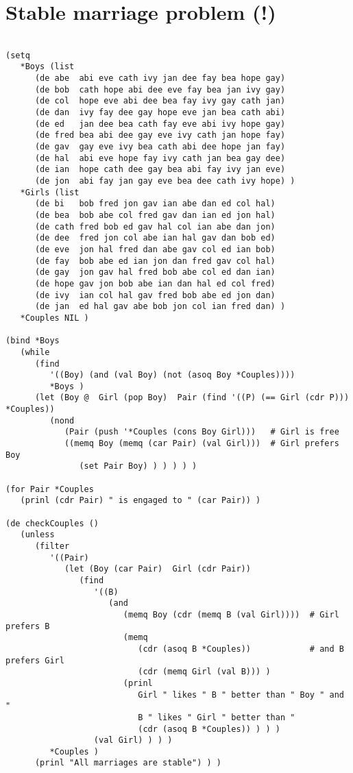 \section*{Stable marriage problem (!)}

\begin{verbatim}

(setq
   *Boys (list
      (de abe  abi eve cath ivy jan dee fay bea hope gay)
      (de bob  cath hope abi dee eve fay bea jan ivy gay)
      (de col  hope eve abi dee bea fay ivy gay cath jan)
      (de dan  ivy fay dee gay hope eve jan bea cath abi)
      (de ed   jan dee bea cath fay eve abi ivy hope gay)
      (de fred bea abi dee gay eve ivy cath jan hope fay)
      (de gav  gay eve ivy bea cath abi dee hope jan fay)
      (de hal  abi eve hope fay ivy cath jan bea gay dee)
      (de ian  hope cath dee gay bea abi fay ivy jan eve)
      (de jon  abi fay jan gay eve bea dee cath ivy hope) )
   *Girls (list
      (de bi   bob fred jon gav ian abe dan ed col hal)
      (de bea  bob abe col fred gav dan ian ed jon hal)
      (de cath fred bob ed gav hal col ian abe dan jon)
      (de dee  fred jon col abe ian hal gav dan bob ed)
      (de eve  jon hal fred dan abe gav col ed ian bob)
      (de fay  bob abe ed ian jon dan fred gav col hal)
      (de gay  jon gav hal fred bob abe col ed dan ian)
      (de hope gav jon bob abe ian dan hal ed col fred)
      (de ivy  ian col hal gav fred bob abe ed jon dan)
      (de jan  ed hal gav abe bob jon col ian fred dan) )
   *Couples NIL )

(bind *Boys
   (while
      (find
         '((Boy) (and (val Boy) (not (asoq Boy *Couples))))
         *Boys )
      (let (Boy @  Girl (pop Boy)  Pair (find '((P) (== Girl (cdr P))) *Couples))
         (nond
            (Pair (push '*Couples (cons Boy Girl)))   # Girl is free
            ((memq Boy (memq (car Pair) (val Girl)))  # Girl prefers Boy
               (set Pair Boy) ) ) ) ) )

(for Pair *Couples
   (prinl (cdr Pair) " is engaged to " (car Pair)) )

(de checkCouples ()
   (unless
      (filter
         '((Pair)
            (let (Boy (car Pair)  Girl (cdr Pair))
               (find
                  '((B)
                     (and
                        (memq Boy (cdr (memq B (val Girl))))  # Girl prefers B
                        (memq
                           (cdr (asoq B *Couples))            # and B prefers Girl
                           (cdr (memq Girl (val B))) )
                        (prinl
                           Girl " likes " B " better than " Boy " and "
                           B " likes " Girl " better than "
                           (cdr (asoq B *Couples)) ) ) )
                  (val Girl) ) ) )
         *Couples )
      (prinl "All marriages are stable") ) )


\end{verbatim}
